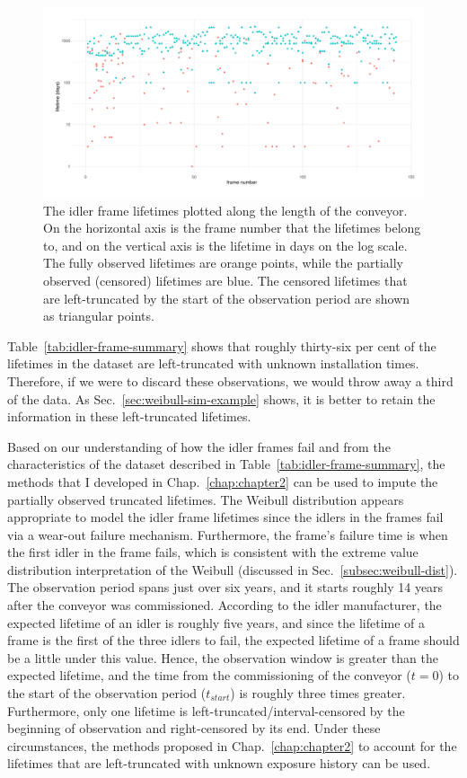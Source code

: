 \begin{figure}[t]
  \centering
  \includegraphics[width=1\textwidth]{./figures/ch-3/idler-frame-data.pdf}
  \caption{The idler frame lifetimes plotted along the length of the conveyor. On the horizontal axis is the frame number that the lifetimes belong to, and on the vertical axis is the lifetime in days on the log scale. The fully observed lifetimes are orange points, while the partially observed (censored) lifetimes are blue. The censored lifetimes that are left-truncated by the start of the observation period are shown as triangular points.}
  \label{fig:idler-frames-data}
\end{figure}

Table~\ref{tab:idler-frame-summary} shows that roughly thirty-six per cent of the lifetimes in the dataset are left-truncated with unknown installation times. Therefore, if we were to discard these observations, we would throw away a third of the data. As Sec.~\ref{sec:weibull-sim-example} shows, it is better to retain the information in these left-truncated lifetimes.

Based on our understanding of how the idler frames fail and from the characteristics of the dataset described in Table~\ref{tab:idler-frame-summary}, the methods that I developed in Chap.~\ref{chap:chapter2} can be used to impute the partially observed truncated lifetimes. The Weibull distribution appears appropriate to model the idler frame lifetimes since the idlers in the frames fail via a wear-out failure mechanism. Furthermore, the frame's failure time is when the first idler in the frame fails, which is consistent with the extreme value distribution interpretation of the Weibull (discussed in Sec.~\ref{subsec:weibull-dist}). The observation period spans just over six years, and it starts roughly 14 years after the conveyor was commissioned. According to the idler manufacturer, the expected lifetime of an idler is roughly five years, and since the lifetime of a frame is the first of the three idlers to fail, the expected lifetime of a frame should be a little under this value. Hence, the observation window is greater than the expected lifetime, and the time from the commissioning of the conveyor ($t = 0$) to the start of the observation period ($t_{start}$) is roughly three times greater. Furthermore, only one lifetime is left-truncated/interval-censored by the beginning of observation and right-censored by its end. Under these circumstances, the methods proposed in Chap.~\ref{chap:chapter2} to account for the lifetimes that are left-truncated with unknown exposure history can be used.

